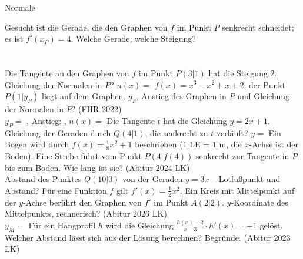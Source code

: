 \setcounter{aufgabe}{17}

\begin{aufgabe}{Normale}
\begin{teile}
\teil Gesucht ist die Gerade, die den Graphen von $f$ im Punkt $P$ senkrecht schneidet; es ist $f'(x_P) = 4$. Welche Gerade, welche Steigung? \\  \\  \\ 
\teil Die Tangente an den Graphen von $f$ im Punkt $P(3 | 1)$ hat die Steigung $2$. Gleichung der Normalen in $P$? $n(x) =$ \leerfeld
\teil $f(x) = x^3 - x^2 + x + 2$; der Punkt $P(1 | y_P)$ liegt auf dem Graphen. $y_P$, Anstieg des Graphen in $P$ und Gleichung der Normalen in $P$? \hfill (FHR 2022) \\ $y_P =$ \leerfeld , Anstieg: \leerfeld , $n(x) =$ \leerfeld
\teil Die Tangente $t$ hat die Gleichung $y = 2x + 1$. Gleichung der Geraden durch $Q(4 | 1)$, die senkrecht zu $t$ verläuft? $y =$ \leerfeld
\teil Ein Bogen wird durch $f(x) = \frac{1}{8}x^2 + 1$ beschrieben ($1$ LE = $1$ m, die $x$-Achse ist der Boden). Eine Strebe führt vom Punkt $P(4 | f(4))$ senkrecht zur Tangente in $P$ bis zum Boden. Wie lang ist sie? \hfill (Abitur 2024 LK) \\ \leerfeld[m]
\teil Abstand des Punktes $Q(10 | 0)$ von der Geraden $y = 3x$ – Lotfußpunkt und Abstand? \leerfeld
\teil Für eine Funktion $f$ gilt $f'(x) = \frac{1}{2}x^2$. Ein Kreis mit Mittelpunkt auf der $y$-Achse berührt den Graphen von $f'$ im Punkt $A(2 | 2)$. $y$-Koordinate des Mittelpunkts, rechnerisch? \hfill (Abitur 2026 LK) \\ $y_M =$ \leerfeld
\teil Für ein Hangprofil $h$ wird die Gleichung $\frac{h(x) - 2}{x - 3} \cdot h'(x) = -1$ gelöst. Welcher Abstand lässt sich aus der Lösung berechnen? Begründe. \hfill (Abitur 2023 LK)
\end{teile}
\end{aufgabe}

